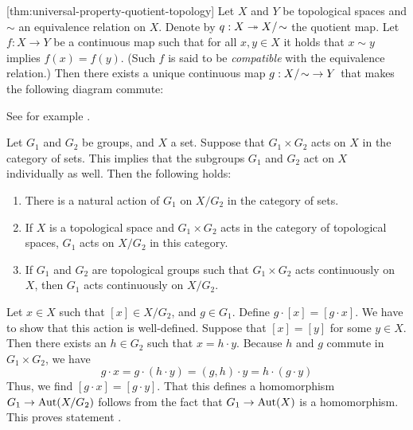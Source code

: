 [thm:universal-property-quotient-topology]
Let $X$ and $Y$ be topological spaces and $\sim$ an equivalence relation on $X$.
Denote by $q : X \twoheadrightarrow X{/\!\sim}$ the quotient map.
Let $f : X \to Y$ be a continuous map such that
for all $x, y \in X$ it holds that $x \sim y$ implies $f(x) = f(y)$.
(Such $f$ is said to be \emph{compatible} with the equivalence relation.)
Then there exists a unique continuous map $g : X{/\!\sim} \to Y$ that makes the following diagram commute:
\vspace{-\parskip}
\begin{center}
\end{center}

\proof
See for example \parencite[ch.~\textsc{i}, \S~3.4]{bourbaki1971}.

\proposition
Let $G_1$ and $G_2$ be groups, and $X$ a set.
Suppose that $G_1 \times G_2$ acts on $X$ in the category of sets.
This implies that the subgroups $G_1$ and $G_2$ act on $X$ individually as well.
Then the following holds:
\begin{enumerate}
\item There is a natural action of $G_1$ on $X / G_2$ in the category of sets.
\item If $X$ is a topological space and $G_1 \times G_2$ acts in the category of topological spaces,
      $G_1$ acts on $X / G_2$ in this category.
\item If $G_1$ and $G_2$ are topological groups such that $G_1 \times G_2$ acts continuously on $X$,
      then $G_1$ acts continuously on $X / G_2$.
\end{enumerate}

\proof
Let $x \in X$ such that $[x] \in X / G_2$, and $g \in G_1$.
Define $g \cdot [x] = [g \cdot x]$.
We have to show that this action is well-defined.
Suppose that $[x] = [y]$ for some $y \in X$.
Then there exists an $h \in G_2$ such that $x = h \cdot y$.
Because $h$ and $g$ commute in $G_1 \times G_2$,
we have
\[ g \cdot x = g \cdot (h \cdot y) = (g, h) \cdot y = h \cdot (g \cdot y) \]
Thus, we find $[g \cdot x] = [g \cdot y]$.
That this defines a homomorphism $G_1 \to \operatorname{Aut}(X / G_2)$ follows
from the fact that $G_1 \to \operatorname{Aut}(X)$ is a homomorphism.
This proves statement .

